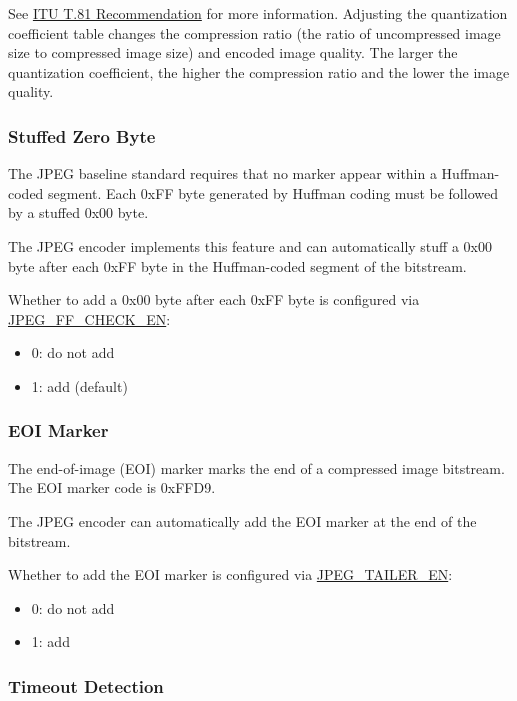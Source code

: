 \documentclass[main\_\_EN.tex]{subfiles}
\begin{document}
See \href{https://www.itu.int/rec/T-REC-T.81}{ITU T.81 Recommendation} for more information. Adjusting the quantization coefficient table changes the compression ratio (the ratio of uncompressed image size to compressed image size) and encoded image quality. The larger the quantization coefficient, the higher the compression ratio and the lower the image quality.

\subsubsection{Stuffed Zero Byte}
\label{sec:jpegcodec-enc-zero_byte}

The JPEG baseline standard requires that no marker appear within a Huffman-coded segment. Each 0xFF byte generated by Huffman coding must be followed by a stuffed 0x00 byte.

The JPEG encoder implements this feature and can automatically stuff a 0x00 byte after each 0xFF byte in the Huffman-coded segment of the bitstream.

Whether to add a 0x00 byte after each 0xFF byte is configured via \hyperref[fielddesc:JPEGFFCHECKEN]{JPEG\_FF\_CHECK\_EN}:
\begin{itemize}
    \item 0: do not add
    \item 1: add (default)
\end{itemize}

\subsubsection{EOI Marker}
\label{sec:jpegcodec-enc-eoi}

The end-of-image (EOI) marker marks the end of a compressed image bitstream. The EOI marker code is 0xFFD9.

The JPEG encoder can automatically add the EOI marker at the end of the bitstream.

Whether to add the EOI marker is configured via \hyperref[fielddesc:JPEGTAILEREN]{JPEG\_TAILER\_EN}:
\begin{itemize}
    \item 0: do not add
    \item 1: add
\end{itemize}

\subsubsection{Timeout Detection}
\label{sec:jpegcodec-enc-timeout}
\end{document}
